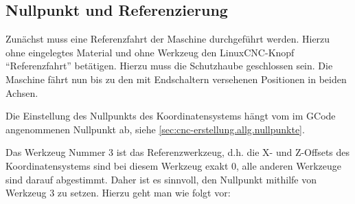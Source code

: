 \documentclass{\basedir/fablab-document}
\begin{document}
\subsection{Nullpunkt und Referenzierung}

Zunächst muss eine Referenzfahrt der Maschine durchgeführt werden. Hierzu ohne eingelegtes Material und ohne Werkzeug den LinuxCNC-Knopf \enquote{Referenzfahrt} betätigen. Hierzu muss die Schutzhaube geschlossen sein. Die Maschine fährt nun bis zu den mit Endschaltern versehenen Positionen in beiden Achsen.

Die Einstellung des Nullpunkts des Koordinatensystems hängt vom im GCode angenommenen Nullpunkt ab, siehe \ref{sec:cnc-erstellung.allg.nullpunkte}.

Das Werkzeug Nummer 3 ist das Referenzwerkzeug, d.h. die X- und Z-Offsets des Koordinatensystems sind bei diesem Werkzeug exakt $0$, alle anderen Werkzeuge sind darauf abgestimmt. Daher ist es sinnvoll, den Nullpunkt mithilfe von Werkzeug 3 zu setzen. Hierzu geht man wie folgt vor:
\end{document}
